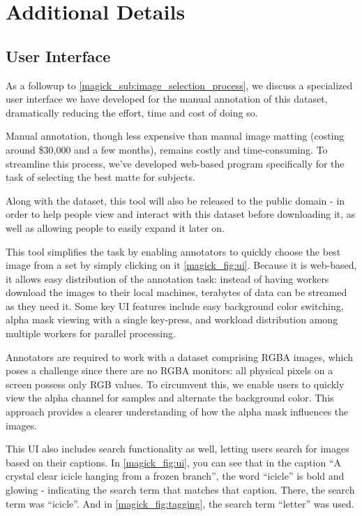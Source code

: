 
\section{Additional Details}

\subsection{User Interface}

As a followup to \cref{magick_sub:image_selection_process}, we discuss a specialized user interface we have developed for the manual annotation of this dataset, dramatically reducing the effort, time and cost of doing so.

Manual annotation, though less expensive than manual image matting (costing around \$30,000 and a few months), remains costly and time-consuming. To streamline this process, we've developed web-based program specifically for the task of selecting the best matte for subjects.

Along with the dataset, this tool will also be released to the public domain - in order to help people view and interact with this dataset before downloading it, as well as allowing people to easily expand it later on.

This tool simplifies the task by enabling annotators to quickly choose the best image from a set by simply clicking on it \cref{magick_fig:ui}. Because it is web-based, it allows easy distribution of the annotation task: instead of having workers download the images to their local machines, terabytes of data can be streamed as they need it. Some key UI features include easy background color switching, alpha mask viewing with a single key-press, and workload distribution among multiple workers for parallel processing.

Annotators are required to work with a dataset comprising RGBA images, which poses a challenge since there are no RGBA monitors: all physical pixels on a screen possess only RGB values. To circumvent this, we enable users to quickly view the alpha channel for samples and alternate the background color. This approach provides a clearer understanding of how the alpha mask influences the images.

This UI also includes search functionality as well, letting users search for images based on their captions. In \cref{magick_fig:ui}, you can see that in the caption ``A crystal clear icicle hanging from a frozen branch'', the word ``icicle'' is bold and glowing - indicating the search term that matches that caption. There, the search term was ``icicle''. And in \cref{magick_fig:tagging}, the search term ``letter'' was used.

